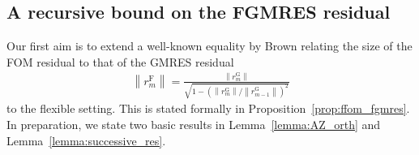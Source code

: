 \documentclass{siamart251216}
\newenvironment{lauri}{\begin{quote}\color{brilliantrose} \small\sf Lauri $\clubsuit$~}{\end{quote}}
\newenvironment{stefan}{\begin{quote}\color{amethyst} \small\sf Stefan $\spadesuit$~}{\end{quote}}
\begin{document}
{%
\subsection{A recursive bound on the FGMRES residual}\label{sec:recur}
Our first aim is to extend a well-known equality by Brown \cite{Brown1991} relating the size of the FOM residual to that of the GMRES residual
\begin{align} \label{eq:FOM_GMRES}
    \left\|r_m^{\mathrm{F}}\right\|=\frac{\left\|r_m^{\mathrm{G}}\right\|}{\sqrt{1-\left(\left\|r_m^{\mathrm{G}}\right\| /\left\|r_{m-1}^{\mathrm{G}}\right\|\right)^2}}
\end{align}
to the flexible setting. This is stated formally in Proposition~\ref{prop:ffom_fgmres}. In preparation, we state two basic results in Lemma~\ref{lemma:AZ_orth} and Lemma~\ref{lemma:successive_res}.




}
\end{document}
